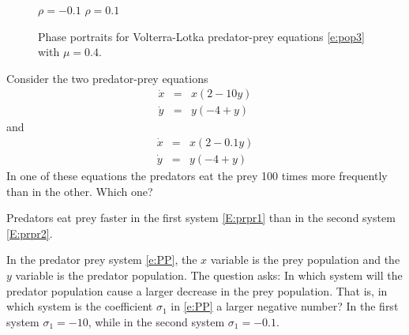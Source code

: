 \documentclass{ximera}
\begin{document}
\begin{figure*}[htb]
           \centerline{%
	   }
		\vspace*{-0.2in}		
		\hspace{1.0in} $\rho=-0.1$ \hspace{2.5in} $\rho=0.1$
           \caption{Phase portraits for Volterra-Lotka predator-prey 
		equations \protect\eqref{e:pop3} with $\mu=0.4$.}
           \label{F:pop3}
\end{figure*}

\EXER

\TEXER

\begin{exercise} \label{c9.1.5}
Consider the two predator-prey equations
\begin{equation} \label{E:prpr1}
\begin{array}{rcl}
\dot{x} & = & x(2-10y)\\
\dot{y} & = & y(-4+y)
\end{array}
\end{equation}
and 
\begin{equation} \label{E:prpr2}
\begin{array}{rcl}
\dot{x} & = & x(2-0.1y)\\
\dot{y} & = & y(-4+y)
\end{array}
\end{equation}
In one of these equations the predators eat the prey 100 times more 
frequently than in the other.  Which one?

\begin{solution}

\ans Predators eat prey faster in the first system \eqref{E:prpr1} than in 
the second system \eqref{E:prpr2}.

\soln  In the predator prey system \eqref{e:PP}, the $x$ variable is the
prey population and the $y$ variable is the predator population.  The
question asks: In which system will the predator population cause a
larger decrease in the prey population.  That is, in which system is
the coefficient $\sigma_1$ in \eqref{e:PP} a larger negative number?  In
the first system $\sigma_1=-10$, while in the second system $\sigma_1=-0.1$.

\end{solution}
\end{exercise}
\end{document}
